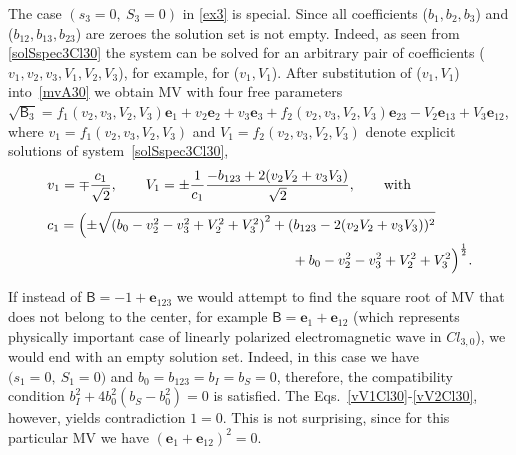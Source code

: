 \documentclass{birkjour}
\newcommand{\e}[1]{\mathbf{e}_{#1}} %
\newcommand{\cl}[2]{\ensuremath{\mathit{Cl}_{#1,#2}}}
\def\B{\mathsf{B}}
\def\e#1{\mathbf{e}_{#1}} %
\begin{document}
The case $(s_{3}=0,\ S_{3}=0)$ in \eqref{ex3} is special. Since
all coefficients ($b_1, b_2, b_3$) and ($b_{12}, b_{13}, b_{23}$)
are zeroes the solution set is not empty. Indeed, as seen  from
\eqref{solSspec3Cl30} the system can  be solved for an arbitrary
pair of coefficients ($v_1,v_2,v_3,V_1,V_2,V_3$), for example, for
($v_1,V_1$). After substitution of ($v_1,V_1$) into~\eqref{mvA30}
we obtain MV with four free parameters
$\sqrt{\B_{3}}=f_1(v_2,v_3,V_2,V_3)\e{1}+v_2\e{2}+v_3\e{3}+f_2(v_2,v_3,V_2,V_3)\e{23}-V_2\e{13}+V_3\e{12}$,
where $v_1=f_1(v_2,v_3,V_2,V_3)$ and $V_1=f_2(v_2,v_3,V_2,V_3)$
denote explicit solutions of system~\eqref{solSspec3Cl30},
\begin{equation}\label{exampleCl30free}
\begin{split}
&v_{1}=\mp \frac{c_1}{\sqrt{2}},\qquad
  V_{1}=\pm \frac{1}{c_1} \frac{-b_{123}+2 (v_{2} V_{2}+v_{3} V_{3})}{\sqrt{2}},\qquad \textrm{with}\quad \\[3pt]
&c_1=\Bigl(\pm\sqrt{\left(b_{0}-v_{2}^2-v_{3}^2+V_{2}^2+V_{3}^2\right)^2+
   (b_{123}-2 (v_{2} V_{2}+v_{3} V_{3}))^2}\\
&\phantom{\frac{1}{\sqrt{2}}b_{0}-v_{2}^2-v_{3}^2  (b_{123}-2
(v_{2} V_{2}+v_{3} V_{3}))x}
 +b_{0}-v_{2}^2-v_{3}^2+V_{2}^2+V_{3}^2\Bigr)^{\frac{1}{2}}
.
\end{split}
\end{equation}
If instead of $\B=-1+\e{123}$ we would attempt to find the square
root of MV that does not belong to the center, for example
$\B=\e{1}+\e{12}$ (which represents physically important case of
linearly polarized electromagnetic wave in $\cl{3}{0}$), we would
end with an empty solution set. Indeed, in this case we have
$\bigl(s_1=0,\ S_1=0\bigr)$ and $b_0=b_{123}=b_I=b_S=0$,
therefore, the compatibility condition $b_{I}^2+4 b_0^2(b_S-
b_0^2)=0$ is satisfied. The Eqs.~\eqref{vV1Cl30}-\eqref{vV2Cl30},
however, yields contradiction $1=0$. This is not surprising, since
for this particular MV we have $(\e{1}+\e{12})^2=0$.
\end{document}
